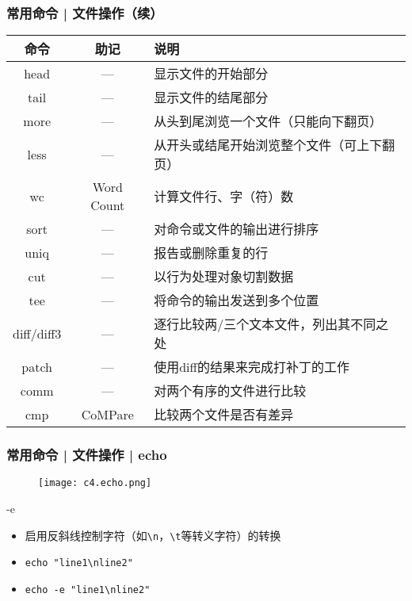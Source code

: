 \begin{frame}
  \frametitle{常用命令 | \alert{文件操作（续）}}
  \begin{table}
    \centering
    \begin{tabularx}{\textwidth}{ccX}
      \hline
      \rowcolor{blue!50}命令 & 助记 & 说明\\
      \hline
      head & --- & 显示文件的开始部分\\
      tail & --- & 显示文件的结尾部分\\
      more & --- & 从头到尾浏览一个文件（只能向下翻页）\\
      less & --- & \footnotesize{从开头或结尾开始浏览整个文件（可上下翻页）}\\
      wc & Word Count & 计算文件行、字（符）数\\
      sort & --- & 对命令或文件的输出进行排序\\
      uniq & --- & 报告或删除重复的行\\
      cut & --- & 以行为处理对象切割数据\\
      tee & --- & 将命令的输出发送到多个位置\\
      diff/diff3 & --- & 逐行比较两/三个文本文件，列出其不同之处\\
      patch & --- & 使用diff的结果来完成打补丁的工作\\
      comm & --- & 对两个有序的文件进行比较\\
      cmp & CoMPare & 比较两个文件是否有差异\\
      \hline
    \end{tabularx}
  \end{table}
\end{frame}

\begin{frame}[fragile]
  \frametitle{常用命令 | 文件操作 | echo}
  \begin{figure}
    \centering
    \texttt{[image: c4.echo.png]}
  \end{figure}
  \pause
  \begin{block}{\alert{-e}}
    \begin{itemize}
      \item 启用反斜线控制字符（如\verb|\n|，\verb|\t|等转义字符）的转换
      \item \verb|echo "line1\nline2"|
      \item \verb|echo -e "line1\nline2"|
    \end{itemize}
  \end{block}
\end{frame}

